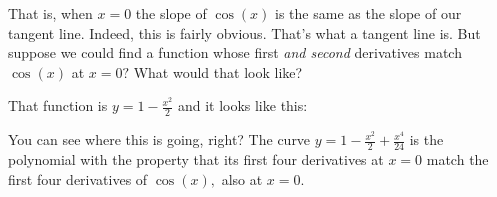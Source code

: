 That is, when $x=0$ the slope of $\cos(x)$ is the same as the slope of
our tangent line. Indeed, this is fairly obvious. That's what a
tangent line is. But suppose we could find a function whose first
\emph{and second} derivatives match $\cos(x)$ at $x=0?$ What would
that look like? 

That function is $y=1-\frac{x^2}{2}$ and it looks like this:
\InsertGraphic{}

You can see where this is going, right? The curve $y=
1-\frac{x^2}{2}+\frac{x^4}{24}$ is the polynomial with the property
that its first four derivatives at $x=0$ match the first four
derivatives of $\cos(x),$ also at  $x=0.$
\enddigress{}



